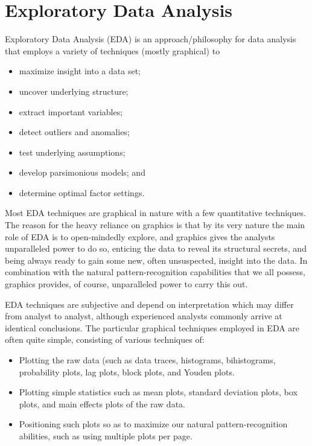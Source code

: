 \documentclass[]{report}
\begin{document}
\chapter{Exploratory Data Analysis}




Exploratory Data Analysis (EDA) is an approach/philosophy for data analysis that employs a variety of techniques (mostly graphical) to

\begin{multicols}{2}
\begin{itemize}
\item maximize insight into a data set;
\item uncover underlying structure;
\item extract important variables;
\item detect outliers and anomalies;
\item test underlying assumptions;
\item develop parsimonious models; and
\item determine optimal factor settings.
\end{itemize}
\end{multicols}
\smallskip


Most EDA techniques are graphical in nature with a few quantitative techniques. The reason for the heavy reliance on graphics is that by its very nature the main role of EDA is to open-mindedly explore, and graphics gives the analysts unparalleled power to do so, enticing the data to reveal its structural secrets, and being always ready to gain some new, often unsuspected, insight into the data. In combination with the natural pattern-recognition capabilities that we all possess, graphics provides, of course, unparalleled power to carry this out.

EDA techniques are subjective and depend on interpretation which may differ from analyst to analyst, although experienced analysts commonly arrive at identical conclusions. The particular graphical techniques employed in EDA are often quite simple, consisting of various techniques of:
\begin{itemize}
\item Plotting the raw data (such as data traces, histograms, bihistograms, probability plots, lag plots, block plots, and Youden plots.

\item Plotting simple statistics such as mean plots, standard deviation plots, box plots, and main effects plots of the raw data.

\item Positioning such plots so as to maximize our natural pattern-recognition abilities, such as using multiple plots per page.
\end{itemize}
\end{document}
